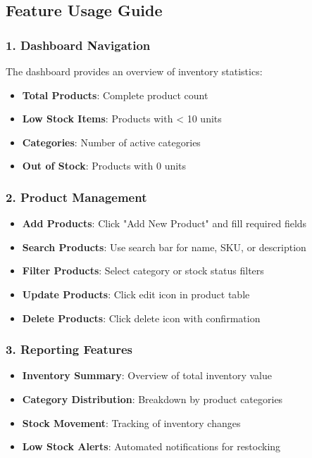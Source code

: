 \documentclass[12pt,a4paper]{article}
\begin{document}
\subsection{Feature Usage Guide}

\subsubsection{1. Dashboard Navigation}
The dashboard provides an overview of inventory statistics:
\begin{itemize}
    \item \textbf{Total Products}: Complete product count
    \item \textbf{Low Stock Items}: Products with < 10 units
    \item \textbf{Categories}: Number of active categories
    \item \textbf{Out of Stock}: Products with 0 units
\end{itemize}

\subsubsection{2. Product Management}
\begin{itemize}
    \item \textbf{Add Products}: Click "Add New Product" and fill required fields
    \item \textbf{Search Products}: Use search bar for name, SKU, or description
    \item \textbf{Filter Products}: Select category or stock status filters
    \item \textbf{Update Products}: Click edit icon in product table
    \item \textbf{Delete Products}: Click delete icon with confirmation
\end{itemize}

\subsubsection{3. Reporting Features}
\begin{itemize}
    \item \textbf{Inventory Summary}: Overview of total inventory value
    \item \textbf{Category Distribution}: Breakdown by product categories
    \item \textbf{Stock Movement}: Tracking of inventory changes
    \item \textbf{Low Stock Alerts}: Automated notifications for restocking
\end{itemize}
\end{document}
